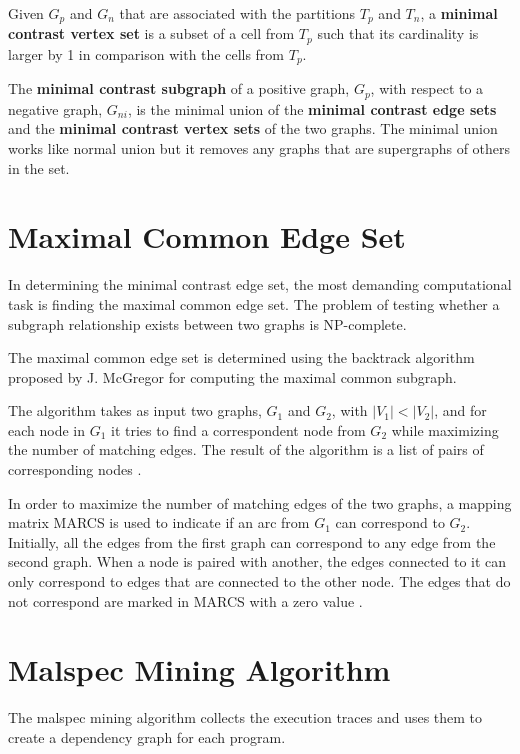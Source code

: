 Given $G_{p}$ and $G_{n}$ that are associated with the partitions $T_{p}$ and $T_{n}$, a \textbf{minimal contrast vertex set} is a subset of a cell from $T_{p}$ such that its cardinality is larger by 1 in comparison with the cells from $T_{p}$.

The \textbf{minimal contrast subgraph} of a positive graph, $G_{p}$, with respect to a negative graph, $G_{ni}$, is the minimal union of the \textbf{minimal contrast edge sets} and the \textbf{minimal contrast vertex sets} of the two graphs. The minimal union works like normal union but it removes any graphs that are supergraphs of others in the set.

\section{Maximal Common Edge Set}
\label{third:maximal-common-edge-set}

In determining the minimal contrast edge set, the most demanding computational task is finding the maximal common edge set. The problem of testing whether a subgraph relationship exists between two graphs is NP-complete.

The maximal common edge set is determined using the backtrack algorithm proposed by J. McGregor for computing the maximal common subgraph.

The algorithm takes as input two graphs, $G_{1}$ and $G_{2}$, with $|V_{1}| < |V_{2}|$, and for each node in $G_{1}$ it tries to find a correspondent node from $G_{2}$ while maximizing the number of matching edges. The result of the algorithm is a list of pairs of corresponding nodes \cite{common-subgraph}.

In order to maximize the number of matching edges of the two graphs, a mapping matrix MARCS is used to indicate if an arc from $G_{1}$ can correspond to $G_{2}$. Initially, all the edges from the first graph can correspond to any edge from the second graph. When a node is paired with another, the edges connected to it can only correspond to edges that are connected to the other node. The edges that do not correspond are marked in MARCS with a zero value \cite{common-subgraph}.

\section{Malspec Mining Algorithm}
\label{third:malspec-algorithm}	

The malspec mining algorithm collects the execution traces and uses them to create a dependency graph for each program.

